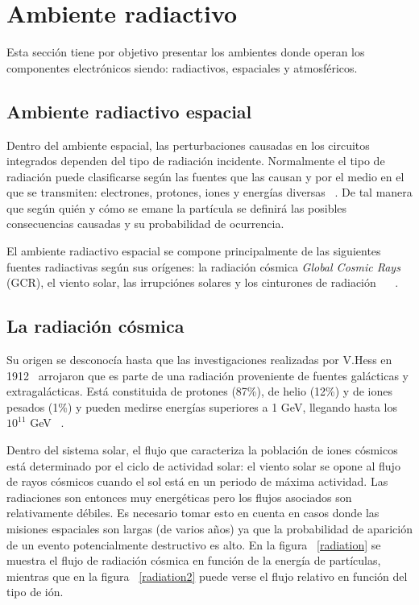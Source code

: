 \documentclass[a4paper,openright,12pt]{report}
\begin{document}
\section{Ambiente radiactivo}

Esta sección tiene por objetivo presentar los ambientes donde operan los componentes electrónicos siendo: radiactivos, espaciales y atmosféricos.

\subsection{Ambiente radiactivo espacial}

Dentro del ambiente espacial, las perturbaciones causadas en los circuitos integrados dependen del tipo de radiación incidente. Normalmente el tipo de radiación puede clasificarse según las fuentes que las causan y por el medio en el que se transmiten: electrones, protones, iones y  energías diversas ~\cite{boudenot1995}. De tal manera que según quién y cómo se emane la partícula se definirá las posibles consecuencias causadas y su probabilidad de ocurrencia. 

El ambiente radiactivo espacial se compone principalmente de las siguientes fuentes radiactivas según sus orígenes: la radiación cósmica \textit{Global Cosmic Rays } (GCR), el viento solar, las irrupciónes solares y los cinturones de radiación ~\cite{stapor1988} ~\cite{tang2004semm}.

\subsection{La radiación cósmica}
Su origen se desconocía hasta que las investigaciones realizadas por V.Hess en 1912~\cite{bourrieau1991environnement} arrojaron que es parte de una radiación proveniente de fuentes galácticas y extragalácticas. Está constituida de protones (87\%), de helio (12\%) y de iones pesados (1\%) y pueden medirse energías  superiores a 1 GeV, llegando hasta los $10^{11}$ GeV ~\cite{fleischer1975nuclear}. 

Dentro del sistema solar, el flujo que caracteriza la población de iones cósmicos está determinado por el ciclo de actividad solar: el viento solar se opone al flujo de rayos cósmicos cuando el sol está en un periodo de máxima actividad. Las radiaciones son entonces muy energéticas pero los flujos asociados son relativamente débiles. Es necesario tomar esto en cuenta en casos donde las misiones espaciales son largas (de varios años) ya que la probabilidad de aparición de un evento potencialmente destructivo es alto. En la figura ~\ref{radiation} se muestra el flujo de radiación cósmica en función de la energía de partículas, mientras que en la figura ~\ref{radiation2}  puede verse el flujo relativo en función del tipo de ión. 
\end{document}
